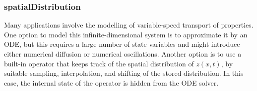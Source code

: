 \subsubsection{spatialDistribution}\label{spatialdistribution}

\begin{nonnormative}
Many applications involve the modelling of variable-speed
transport of properties. One option to model this infinite-dimensional
system is to approximate it by an ODE, but this requires a large number
of state variables and might introduce either numerical diffusion or
numerical oscillations. Another option is to use a built-in operator
that keeps track of the spatial distribution of $z(x, t)$, by suitable
sampling, interpolation, and shifting of the stored distribution. In
this case, the internal state of the operator is hidden from the ODE
solver.
\end{nonnormative}

